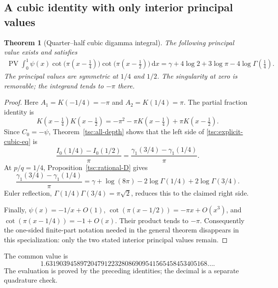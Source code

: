 \documentclass[11pt]{article}
\numberwithin{equation}{section}
\newtheorem{theorem}{Theorem}[section]
\theoremstyle{definition}\newtheorem{definition}[theorem]{Definition}
\theoremstyle{remark}\newtheorem{remark}[theorem]{Remark}
\DeclareMathOperator{\PV}{PV}
\newcommand{\dd}{\,\mathrm d}
\begin{document}
\subsection{A cubic identity with only interior principal values}
\begin{theorem}[Quarter--half cubic digamma integral]\label{tsc:explicit-cubic}
The following principal value exists and satisfies
\begin{align}\label{tsc:explicit-cubic-eq}
 \boxed{\displaystyle
 \PV\int_0^1\psi(x)
     \cot\!\bigl(\pi(x-\tfrac14)\bigr)
     \cot\!\bigl(\pi(x-\tfrac12)\bigr)\dd x
  =\gamma+4\log2+3\log\pi-4\log\Gamma(\tfrac14).}
\end{align}
The principal values are symmetric at $1/4$ and $1/2$. The singularity at
zero is removable; the integrand tends to $-\pi$ there.
\end{theorem}
\begin{proof}
Here $A_1=K(-1/4)=-\pi$ and $A_2=K(1/4)=\pi$. The partial fraction
identity is
\[
 K(x-\tfrac14)K(x-\tfrac12)
        =-\pi^2-\pi K(x-\tfrac14)+\pi K(x-\tfrac12).
\]
Since $C_0=-\psi$, Theorem~\ref{tsc:all-depth} shows that the left side of
\eqref{tsc:explicit-cubic-eq} is
\[
 \frac{I_0(1/4)-I_0(1/2)}\pi
      =\frac{\gamma_1(3/4)-\gamma_1(1/4)}\pi.
\]
At $p/q=1/4$, Proposition~\ref{tsc:rational-D} gives
\[
 \frac{\gamma_1(3/4)-\gamma_1(1/4)}\pi
  =\gamma+\log(8\pi)-2\log\Gamma(1/4)+2\log\Gamma(3/4).
\]
Euler reflection, $\Gamma(1/4)\Gamma(3/4)=\pi\sqrt2$, reduces this to
the claimed right side.

Finally, $\psi(x)=-1/x+O(1)$,
$\cot(\pi(x-1/2))=-\pi x+O(x^3)$, and
$\cot(\pi(x-1/4))=-1+O(x)$. Their product tends to $-\pi$.
Consequently the one-sided finite-part notation needed in the general
theorem disappears in this specialization: only the two stated interior
principal values remain.
\end{proof}
The common value is
\[
 1.63190394589720479122328086909541565458453405168\ldots.
\]
The evaluation is proved by the preceding identities; the decimal is a
separate quadrature check.
\end{document}
